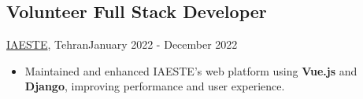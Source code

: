 \subsection{Volunteer Full Stack Developer}{\href{https://iaeste.org/}{IAESTE}, Tehran}{January 2022 - December 2022}
\begin{itemize}
    \item Maintained and enhanced IAESTE’s web platform using \textbf{Vue.js} and \textbf{Django}, improving performance and user experience.
\end{itemize}

